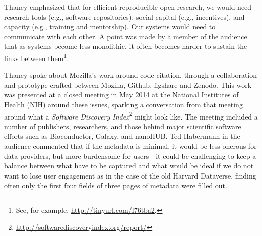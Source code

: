 \documentclass[11pt, oneside]{amsart}
\begin{document}
\begin{comment}
(Kaitlin didn't really say why? Were the tools used? Did they immediately
bit-rot? Was their development unsustained?)-should ask question about this. Is
there a caBIG report available? Quotes from Andrea Califano/Joe Gray, looks like
there is: \url{tinyurl.com/qdodbo7}.

What do we mean by open research? In regard to community/technology/practices

Inefficiency cartoon:  \url{http://www.xkcd.com/1445/}. 
\end{comment}

Thaney emphasized that for efficient reproducible open research, we would need
research tools (e.g., software repositories), social capital (e.g., incentives),
and capacity (e.g., training and mentorship). Our systems would need to
communicate with each other. A point was made by a member of the audience that
as systems become less monolithic, it often becomes harder to sustain the links
between them\footnote{See, for example, \url{http://tinyurl.com/l76tba2}.}.

Thaney spoke about Mozilla's work around code citation, through a collaboration
and prototype crafted between Mozilla, Github, figshare and Zenodo. This work
was presented at a closed meeting in May 2014 at the National Institutes of
Health (NIH) around these issues, sparking a conversation from that meeting
around what a \emph{Software Discovery
Index}\footnote{\url{http://softwarediscoveryindex.org/report/}} might look
like. The meeting included a number of publishers, researchers, and those behind
major scientific software efforts such as Bioconductor, Galaxy, and
nanoHUB. 
Ted Habermann in the audience commented that if the metadata is minimal, it
would be less onerous for data providers, but more burdensome for users---it
could be challenging to keep a balance between what have to be captured and what
would be ideal if we do not want to lose user engagement as in the case of the
old Harvard Dataverse, finding often only the first four fields of three pages
of metadata were filled out.
 
\end{document}
